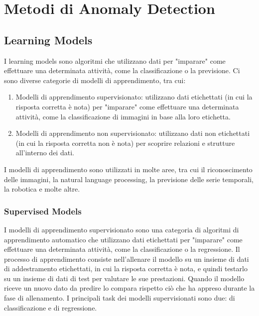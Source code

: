 \chapter{Metodi di Anomaly Detection}

\section{Learning Models}
I learning models sono algoritmi che utilizzano dati per "imparare" come effettuare una determinata attività, come la classificazione o la previsione. Ci sono diverse categorie di modelli di apprendimento, tra cui:
\begin{enumerate}
\item Modelli di apprendimento supervisionato: utilizzano dati etichettati (in cui la risposta corretta è nota) per "imparare" come effettuare una determinata attività, come la classificazione di immagini in base alla loro etichetta.
\item Modelli di apprendimento non supervisionato: utilizzano dati non etichettati (in cui la risposta corretta non è nota) per scoprire relazioni e strutture all'interno dei dati.
\end{enumerate}

I modelli di apprendimento sono utilizzati in molte aree, tra cui il riconoscimento delle immagini, la natural language processing, la previsione delle serie temporali, la robotica e molte altre.

\subsection{Supervised Models}
I modelli di apprendimento supervisionato sono una categoria di algoritmi di apprendimento automatico che utilizzano dati etichettati per "imparare" come effettuare una determinata attività, come la classificazione o la regressione. Il processo di apprendimento consiste nell'allenare il modello su un insieme di dati di addestramento etichettati, in cui la risposta corretta è nota, e quindi testarlo su un insieme di dati di test per valutare le sue prestazioni. Quando il modello riceve un nuovo dato da predire lo compara rispetto ciò che ha appreso durante la fase di allenamento. I principali task dei modelli supervisionati sono due: di classificazione e di regressione.


